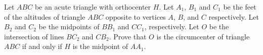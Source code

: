 Let $ABC$ be an acute triangle with orthocenter $H$. Let $A_1$, $B_1$ and $C_1$ be the feet of the altitudes of triangle $ABC$ opposite to vertices $A$, $B$, and $C$ respectively. Let $B_2$ and $C_2$ be the midpoints of $BB_1$ and $CC_1$, respectively. Let $O$ be the intersection of lines $BC_2$ and $CB_2$. Prove that $O$ is the circumcenter of triangle $ABC$ if and only if $H$ is the midpoint of $AA_1$.

